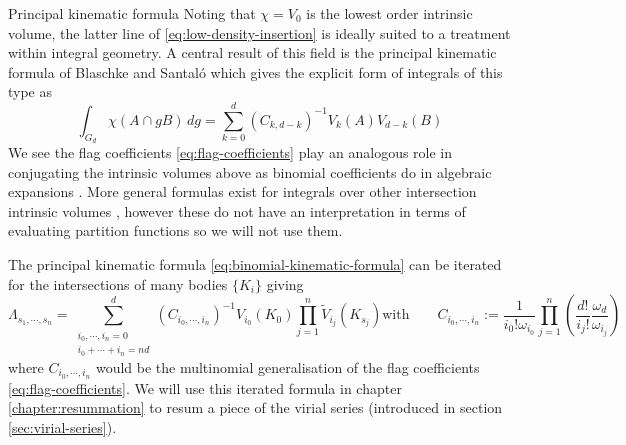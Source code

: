 \begin{theorem}{Principal kinematic formula}
  Noting that $\chi = V_0$ is the lowest order intrinsic volume, the latter line of \eqref{eq:low-density-insertion} is ideally suited to a treatment within integral geometry.
  A central result of this field is the principal kinematic formula of Blaschke and Santal\'o \cite{BlaschkeMZ1936,Blaschke1937,SantaloASI1936} which gives the explicit form of integrals of this type as \cite{Santalo2004,Klain1997}
  \begin{equation}\label{eq:binomial-kinematic-formula}
    \int_{G_d} \chi(A \cap gB) \, dg
    =
    \sum_{k=0}^d (C_{k,d-k})^{-1} V_k(A) V_{d-k}(B)
  \end{equation}
  We see the flag coefficients \eqref{eq:flag-coefficients} play an analogous role in conjugating the intrinsic volumes above as binomial coefficients do in algebraic expansions%
  .
  More general formulas exist for integrals over other intersection intrinsic volumes \cite{Klain1997}, however these do not have an interpretation in terms of evaluating partition functions so we will not use them.
\end{theorem}

The principal kinematic formula \eqref{eq:binomial-kinematic-formula} can be iterated for the intersections of many bodies $\{K_i\}$ giving \cite{Santalo2004,MarechalPRE2014}
\begin{subequations}\label{eq:multinomial-kinematic-formula}
  \begin{equation}
    \Lambda_{s_1, \cdots, s_n}
    =
      \sum_{\substack{i_0, \cdots, i_n = 0 \\ i_0 + \cdots + i_n = nd}}^d
      (C_{i_0, \cdots, i_n})^{-1}
      V_{i_0}(K_0)
      \prod_{j=1}^n
      \widetilde{V}_{i_j}(K_{s_j})
  \end{equation}
  \begin{equation}
    \textrm{with} \qquad
    C_{i_0, \cdots, i_n}
    := \frac{1}{i_0! \omega_{i_0}}
    \prod_{j=1}^n
    \left(
    \frac{d!}{i_j!} \frac{\omega_d}{\omega_{i_j}}
    \right)
  \end{equation}
\end{subequations}
where $C_{i_0, \cdots, i_n}$ would be the multinomial generalisation of the flag coefficients \eqref{eq:flag-coefficients}.
We will use this iterated formula in chapter \ref{chapter:resummation} to resum a piece of the virial series (introduced in section \ref{sec:virial-series}).

